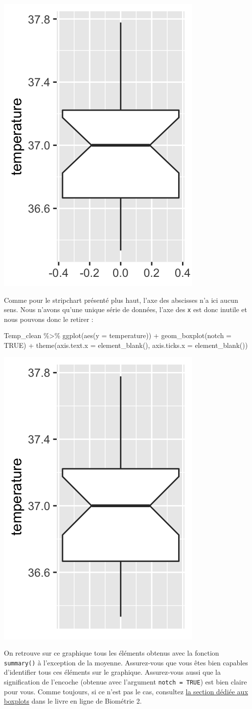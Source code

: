 \documentclass[
  a4paper,
]{article}
\newenvironment{Shaded}{\begin{snugshade}}{\end{snugshade}}
\newcommand{\AttributeTok}[1]{\textcolor[rgb]{0.00,0.34,0.68}{#1}}
\newcommand{\ConstantTok}[1]{\textcolor[rgb]{0.67,0.33,0.00}{#1}}
\newcommand{\FunctionTok}[1]{\textcolor[rgb]{0.39,0.29,0.61}{#1}}
\newcommand{\NormalTok}[1]{\textcolor[rgb]{0.12,0.11,0.11}{#1}}
\newcommand{\SpecialCharTok}[1]{\textcolor[rgb]{0.24,0.68,0.91}{#1}}
\begin{document}
\begin{center}\includegraphics[width=0.25\linewidth]{figure/unnamed-chunk-19-1} \end{center}

Comme pour le stripchart présenté plus haut, l'axe des abscisses n'a ici aucun sens. Nous n'avons qu'une unique série de données, l'axe des \texttt{x} est donc inutile et nous pouvons donc le retirer :

\begin{Shaded}
\begin{Highlighting}[]
\NormalTok{Temp\_clean }\SpecialCharTok{\%\textgreater{}\%} 
  \FunctionTok{ggplot}\NormalTok{(}\FunctionTok{aes}\NormalTok{(}\AttributeTok{y =}\NormalTok{ temperature)) }\SpecialCharTok{+}
  \FunctionTok{geom\_boxplot}\NormalTok{(}\AttributeTok{notch =} \ConstantTok{TRUE}\NormalTok{) }\SpecialCharTok{+}
  \FunctionTok{theme}\NormalTok{(}\AttributeTok{axis.text.x =} \FunctionTok{element\_blank}\NormalTok{(),}
        \AttributeTok{axis.ticks.x =} \FunctionTok{element\_blank}\NormalTok{())}
\end{Highlighting}
\end{Shaded}

\begin{center}\includegraphics[width=0.25\linewidth]{figure/unnamed-chunk-20-1} \end{center}

On retrouve sur ce graphique tous les éléments obtenus avec la fonction \texttt{summary()} à l'exception de la moyenne. Assurez-vous que vous êtes bien capables d'identifier tous ces éléments sur le graphique. Assurez-vous aussi que la signification de l'encoche (obtenue avec l'argument \texttt{notch\ =\ TRUE}) est bien claire pour vous. Comme toujours, si ce n'est pas le cas, consultez \href{https://besibo.github.io/DA/viz.html\#les-boites-a-moustaches-ou-boxplots}{la section dédiée aux boxplots} dans le livre en ligne de Biométrie 2.
\end{document}
